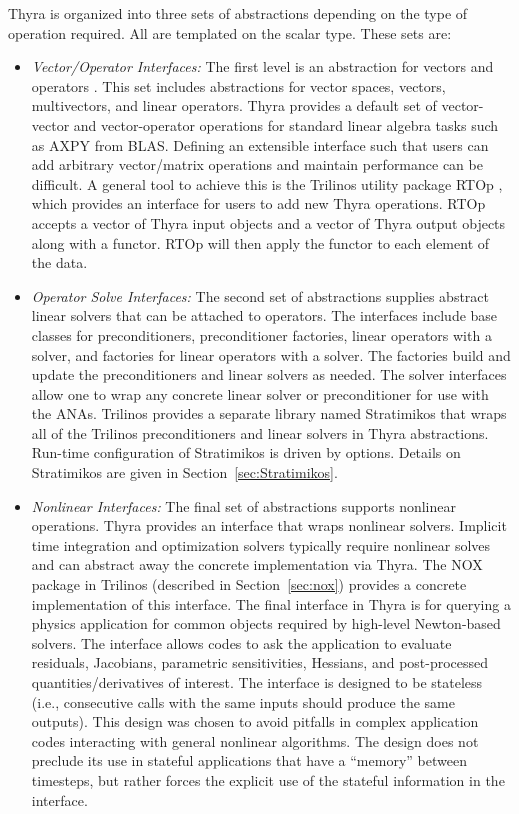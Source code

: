 Thyra is organized into three sets of abstractions depending on the type of operation required. All are templated on the scalar type. These sets are:
\begin{itemize}
\item \emph{Vector/Operator Interfaces:} The first level is an abstraction for vectors and operators \cite{Bartlett2007}. This set includes abstractions for vector spaces, vectors, multivectors, and linear operators. Thyra provides a default set of vector-vector and vector-operator operations for standard linear algebra tasks such as AXPY from BLAS. Defining an extensible interface such that users can add arbitrary vector/matrix operations and maintain performance can be difficult. A general tool to achieve this is the Trilinos utility package RTOp \cite{rtop}, which provides an interface for users to add new Thyra operations. RTOp accepts a vector of Thyra input objects and a vector of Thyra output objects along with a functor. RTOp will then apply the functor to each element of the data.

\item \emph{Operator Solve Interfaces:} The second set of abstractions supplies abstract linear solvers that can be attached to operators. The interfaces include base classes for preconditioners, preconditioner factories, linear operators with a solver, and factories for linear operators with a solver. The factories build and update the preconditioners and linear solvers as needed. The solver interfaces allow one to wrap any concrete linear solver or preconditioner for use with the ANAs. Trilinos provides a separate library named Stratimikos that wraps all of the Trilinos preconditioners and linear solvers in Thyra abstractions. Run-time configuration of Stratimikos is driven by  options.
Details on Stratimikos are given in Section~\ref{sec:Stratimikos}.

\item \emph{Nonlinear Interfaces:} The final set of abstractions supports nonlinear operations. Thyra provides an interface that wraps nonlinear solvers. Implicit time integration and optimization solvers typically require nonlinear solves and can abstract away the concrete implementation via Thyra. The NOX package in Trilinos (described in Section~\ref{sec:nox}) provides a concrete implementation of this interface. The final interface in Thyra is for querying a physics application for common objects required by high-level Newton-based solvers. The  interface allows codes to ask the application to evaluate residuals, Jacobians, parametric sensitivities, Hessians, and post-processed quantities/derivatives of interest. The interface is designed to be stateless (i.e., consecutive calls with the same inputs should produce the same outputs). This design was chosen to avoid pitfalls in complex application codes interacting with general nonlinear algorithms. The design does not preclude its use in stateful applications that have a ``memory'' between timesteps, but rather forces the explicit use of the stateful information in the interface.
\end{itemize}


